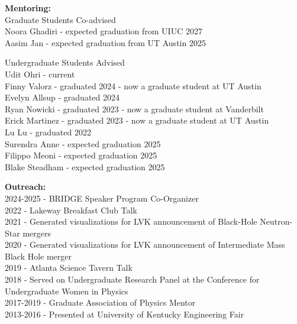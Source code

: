 \documentclass[11pt]{article}
\begin{document}
\begin{flushleft}
  \vspace{8px}
  
  \textbf{Mentoring:}\\
  Graduate Students Co-advised\\
  \quad Noora Ghadiri - expected graduation from UIUC 2027\\
  \quad Aasim Jan - expected graduation from UT Austin 2025\\
  
  \vspace{4px}
   
   Undergraduate Students Advised \\
   \quad Udit Ohri - current\\
   \quad Finny Valorz - graduated 2024 - now a graduate student at UT Austin\\   
   \quad Evelyn Allsup - graduated 2024\\
   \quad Ryan Nowicki - graduated 2023 - now a graduate student at Vanderbilt\\
   \quad Erick Martinez - graduated 2023 - now a graduate student at UT Austin\\
   \quad Lu Lu - graduated 2022\\
   \quad Surendra Anne - expected graduation 2025\\
   \quad Filippo Meoni - expected graduation 2025\\
   \quad Blake Steadham - expected graduation 2025\\
    
 
  \vspace{8px}   
 
  \textbf{Outreach:}\\
  2024-2025 - BRIDGE Speaker Program Co-Organizer\\ 
  2022 - Lakeway Breakfast Club Talk\\
  2021 - Generated visualizations for LVK announcement of Black-Hole Neutron-Star mergers\\
  2020 - Generated visualizations for LVK announcement of Intermediate Mass Black Hole merger\\
  2019 - Atlanta Science Tavern Talk\\
  2018 - Served on Undergraduate Research Panel at the Conference for Undergraduate Women in Physics\\
  2017-2019 - Graduate Association of Physics Mentor\\
  2013-2016 - Presented at University of Kentucky Engineering Fair\\


\end{flushleft}
\end{document}
